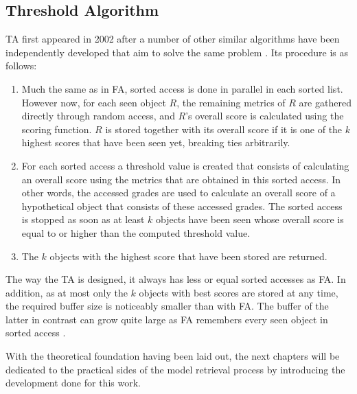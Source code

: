 \subsection{Threshold Algorithm}

TA first appeared in 2002 after a number of other similar algorithms have been independently developed that aim to solve the same problem \cite{fagin2002a}. Its procedure is as follows:

\begin{enumerate}

\item Much the same as in FA, sorted access is done in parallel in each sorted list. However now, for each seen object $R$, the remaining metrics of $R$ are gathered directly through random access, and $R$’s overall score is calculated using the scoring function. $R$ is stored together with its overall score if it is one of the $k$ highest scores that have been seen yet, breaking ties arbitrarily. 

\item For each sorted access a threshold value is created that consists of calculating an overall score using the metrics that are obtained in this sorted access. In other words, the accessed grades are used to calculate an overall score of a hypothetical object that consists of these accessed grades.  The sorted access is stopped as soon as at least $k$ objects have been seen whose overall score is equal to or higher than the computed threshold value. 

\item The $k$ objects with the highest score that have been stored are returned.

\end{enumerate}
 

 The way the TA is designed, it always has less or equal sorted accesses as FA. In addition, as at most only the $k$ objects with best scores are stored at any time, the required buffer size is noticeably smaller than with FA. The buffer of the latter in contrast can grow quite large as FA remembers every seen object in sorted access \cite{fagin2002}.


With the theoretical foundation having been laid out, the next chapters will be dedicated to the practical sides of the model retrieval process by introducing the development done for this work.